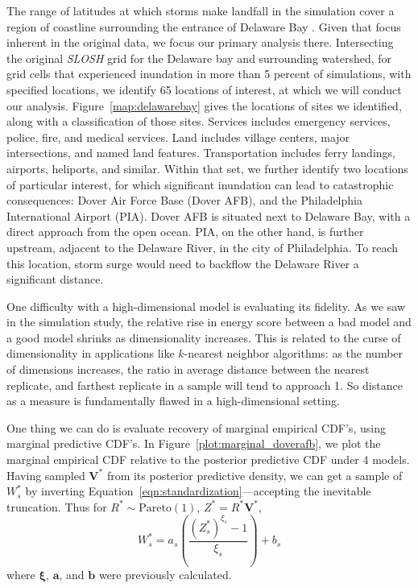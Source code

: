 The range of latitudes at which storms make landfall in the simulation cover a region of
    coastline surrounding the entrance of Delaware Bay .  Given that focus inherent in the original data, we focus our primary analysis there.
    Intersecting the original \emph{SLOSH} grid for the Delaware bay and surrounding watershed, 
    for grid cells that experienced inundation in more than 5 percent of simulations, 
    with specified locations, we identify 65 locations of interest, at which we will conduct 
    our analysis.  Figure~\ref{map:delawarebay} gives the locations of sites we identified, along
    with a classification of those sites.  Services includes emergency services, police, fire,
    and medical services.  Land includes village centers, major intersections, and named
    land features.  Transportation includes ferry landings, airports, heliports, and similar.
    Within that set, we further identify two locations of particular interest, 
    for which significant inundation can lead to catastrophic consequences:  
    Dover Air Force Base (Dover AFB), and the Philadelphia International 
    Airport (PIA). Dover AFB is situated next to Delaware Bay, with a direct approach from the
    open ocean.  PIA, on the other hand, is further upstream, adjacent to the Delaware River, 
    in the city of Philadelphia.  To reach this location, storm surge would need to backflow 
    the Delaware River a significant distance.

One difficulty with a high-dimensional model is evaluating its fidelity.  As we saw in the simulation
    study, the relative rise in energy score between a bad model and a good model shrinks as
    dimensionality increases.  This is related to the curse of dimensionality in applications like
    $k$-nearest neighbor algorithms: as the number of dimensions increases, the ratio in average
    distance between the nearest replicate, and farthest replicate in a sample will tend to approach 1.
    So distance as a measure is fundamentally flawed in a high-dimensional setting.

One thing we can do is evaluate recovery of marginal empirical CDF's, using marginal
    predictive CDF's.  In Figure~\ref{plot:marginal_doverafb}, we plot the marginal
    empirical CDF relative to the posterior predictive CDF under \num{4} models.  
    Having sampled $\bm{V}^{*}$ from its posterior predictive density, we can get a sample of $W_s^*$
    by inverting Equation~\eqref{eqn:standardization}---accepting the inevitable truncation.  Thus
    for $R^*\sim\text{Pareto}(1)$, $Z^* = R^*\bm{V}^*$,
    \begin{equation*}
        W_s^* = a_s\left(\frac{(Z_s^*)^{\xi_s} - 1}{\xi_s}\right) + b_s
    \end{equation*}
    where $\bm{\xi}$, $\bm{a}$, and $\bm{b}$ were previously calculated.  
    
